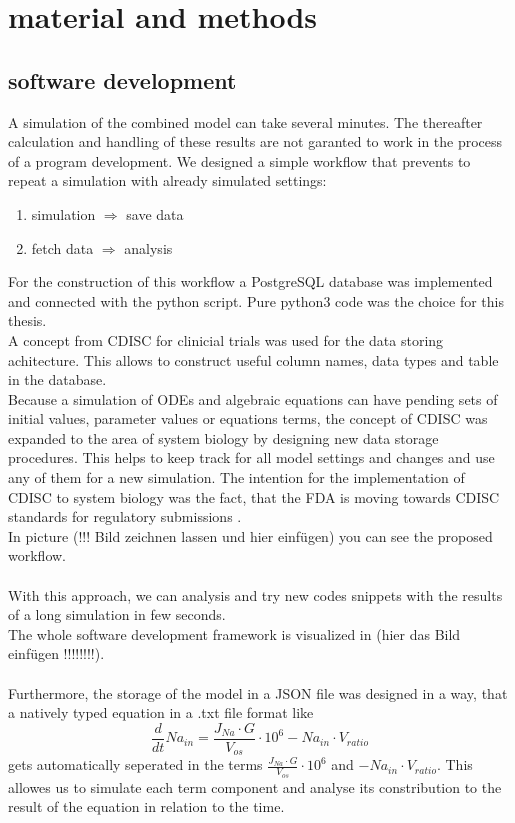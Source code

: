 
\section{material and methods}
\subsection{software development}
A simulation of the combined model can take several minutes. The thereafter calculation and handling of these results are not garanted to work in the process of a program development. We designed a simple workflow that prevents to repeat a simulation with already simulated settings:
\begin{enumerate}
	\item simulation $\Rightarrow$ save data
	\item fetch data $\Rightarrow$ analysis
\end{enumerate}
For the construction of this workflow a PostgreSQL database was implemented and connected with the python script. Pure python3 code was the choice for this thesis.  \\
A concept from CDISC for clinicial trials was used for the data storing achitecture. This allows to construct useful column names, data types and table in the database.\\ 
Because a simulation of ODEs and algebraic equations can have pending sets of initial values, parameter values or equations terms, the concept of CDISC was expanded to the area of system biology by designing new data storage procedures. This helps to keep track for all model settings and changes and use any of them for a new simulation. The intention for the  implementation of CDISC to system biology was the fact, that the FDA is moving towards CDISC standards for regulatory submissions \cite{SDTMStandard}. \\
In picture (!!! Bild zeichnen lassen und hier einfügen) you can see  the proposed workflow.\\\\
With this approach, we can analysis and try new codes snippets with the results of a long simulation in few seconds. \\
The whole software development framework is visualized in (hier das Bild einfügen !!!!!!!!). \\\\
Furthermore, the storage of the model in a JSON file was designed in a way, that a natively typed equation in a .txt file format like 
\begin{equation*}
	\frac{d}{dt} Na_{in} = \frac{J_{Na} \cdot G}{V_{os}} \cdot 10^6 - Na_{in} \cdot V_{ratio} 
\end{equation*}
gets automatically seperated in the terms $\frac{J_{Na} \cdot G}{V_{os}} \cdot 10^6$ and $- Na_{in} \cdot V_{ratio}$. This allowes us to simulate each term component and analyse its constribution to the result of the equation in relation to the time.\\
\newpage